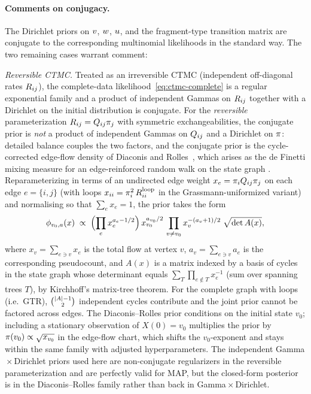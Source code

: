 \paragraph{Comments on conjugacy.}
The Dirichlet priors on $v$, $w$, $u$, and the
fragment-type transition matrix are conjugate to the corresponding
multinomial likelihoods in the standard way.  The two remaining cases
warrant comment:

\emph{Reversible CTMC.}  Treated as an irreversible CTMC (independent
off-diagonal rates $R_{ij}$), the complete-data
likelihood~\eqref{eq:ctmc-complete} is a regular exponential family
and a product of independent Gammas on $R_{ij}$ together with a
Dirichlet on the initial distribution is conjugate.  For the
\emph{reversible} parameterization $R_{ij} = Q_{ij}\pi_j$
with symmetric exchangeabilities, the conjugate prior is
\emph{not} a product of independent Gammas on $Q_{ij}$ and a
Dirichlet on $\pi$: detailed balance couples the two factors, and
the conjugate prior is the cycle-corrected edge-flow density of
Diaconis and Rolles~\cite{DiaconisRolles2006},
which arises as the de Finetti mixing measure for an
edge-reinforced random walk on the state graph
\cite{Rolles2003,CoppersmithDiaconis1986}.  Reparameterizing in terms
of an undirected edge weight $x_e = \pi_i Q_{ij} \pi_j$
on each edge $e = \{i,j\}$ (with loops $x_{ii} = \pi_i^2\,
R^{\mathrm{loop}}_{ii}$ in the Grassmann-uniformized variant) and
normalising so that $\sum_e x_e = 1$, the prior takes the form
\[
\phi_{v_0,a}(x) \;\propto\;
  \Bigl(\prod_e x_e^{a_e - 1/2}\Bigr)\,
  x_{v_0}^{a_{v_0}/2}\,
  \prod_{v \ne v_0} x_v^{-(a_v + 1)/2}
  \;\sqrt{\det A(x)},
\]
where $x_v = \sum_{e \ni v} x_e$ is the total flow at vertex $v$,
$a_v = \sum_{e \ni v} a_e$ is the corresponding pseudocount, and
$A(x)$ is a matrix indexed by a basis of cycles in the state graph
whose determinant equals
$\sum_{T} \prod_{e \notin T} x_e^{-1}$ (sum over spanning trees $T$),
by Kirchhoff's matrix-tree theorem.  For the complete graph with
loops (i.e.\ GTR), $\binom{|A|-1}{2}$ independent cycles
contribute and the joint prior cannot be factored across edges.
The Diaconis--Rolles prior conditions on the initial state $v_0$;
including a stationary observation of $X(0)=v_0$ multiplies the prior
by $\pi(v_0) \propto \sqrt{x_{v_0}}$ in the edge-flow chart, which
shifts the $v_0$-exponent and stays within the same family with
adjusted hyperparameters.  The independent Gamma${}\times{}$Dirichlet
priors used here are non-conjugate regularizers in the reversible
parameterization and are perfectly valid for MAP, but the closed-form
posterior is in the Diaconis--Rolles family rather than back in
Gamma${}\times{}$Dirichlet.

